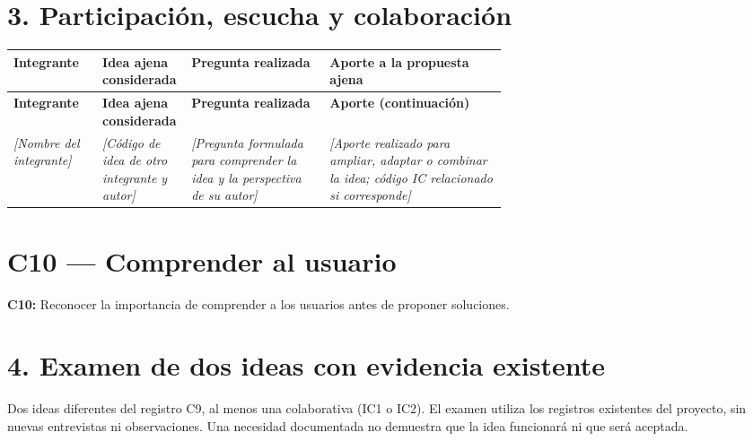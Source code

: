 \documentclass[12pt,a4paper]{article}
\newcommand{\campo}[1]{\textcolor{InstructionColor}{\textit{[#1]}}}
\newcommand{\concept}[1]{\textcolor{ConceptColor}{\textbf{#1}}}
\begin{document}
\section*{3. Participación, escucha y colaboración}
{\small
\begin{longtable}{|P{0.18\linewidth}|P{0.18\linewidth}|P{0.28\linewidth}|P{\arrayrulewidth\relax}|}
\hline
\textbf{Integrante} & \textbf{Idea ajena considerada} & \textbf{Pregunta realizada} & \textbf{Aporte a la propuesta ajena} \\\hline
\endfirsthead
\hline
\textbf{Integrante} & \textbf{Idea ajena considerada} & \textbf{Pregunta realizada} & \textbf{Aporte (continuación)} \\\hline
\endhead
\campo{Nombre del integrante} & \campo{Código de idea de otro integrante y autor} & \campo{Pregunta formulada para comprender la idea y la perspectiva de su autor} & \campo{Aporte realizado para ampliar, adaptar o combinar la idea; código IC relacionado si corresponde} \\\hline
\end{longtable}
}

\section*{C10 --- Comprender al usuario}
\concept{C10:} Reconocer la importancia de comprender a los usuarios antes de proponer soluciones.

\section*{4. Examen de dos ideas con evidencia existente}
Dos ideas diferentes del registro C9, al menos una colaborativa (IC1 o IC2). El examen utiliza los registros existentes del proyecto, sin nuevas entrevistas ni observaciones. Una necesidad documentada no demuestra que la idea funcionará ni que será aceptada.
\end{document}
